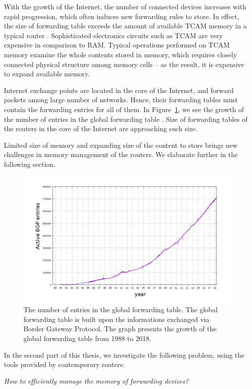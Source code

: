 With the growth of the Internet, the number of connected devices increases with rapid progression, which often induces new forwarding rules to store.
In effect, the size of forwarding table exceeds the amount of available TCAM memory in a typical router .
Sophisticated electronics circuits such as TCAM are very expensive in comparison to RAM.
Typical operations performed on TCAM memory examine the whole contents stored in memory, which requires closely connected physical structure among memory cells -- as the result, it is expensive to expand available memory.

Internet exchange points are located in the core of the Internet, and forward packets among large number of networks.
Hence, their forwarding tables must contain the forwarding entries for all of them.
In Figure~\ref{fig:bgp-entries}, we see the growth of the number of entries in the global forwarding table \cite{url-bgp-entries}.
Size of forwarding tables of the routers in the core of the Internet are approaching such size.

Limited size of memory and expanding size of the content to store brings new challenges in memory management of the routers.
We elaborate further in the following section.

\begin{figure}[t]
\centering
\includegraphics[width=0.59\columnwidth]{figs/bgp-entries.png}
\caption{The number of entries in the global forwarding table. The global forwarding table is built upon the informations exchanged via Border Gateway Protocol. The graph presents the growth of the global forwarding table from 1988 to 2018.}\label{fig:bgp-entries}
\vspace{-1em}
\end{figure}



In the second part of this thesis, we investigate the following problem, using the tools provided by contemporary routers:
\begin{center}
  \emph{How to efficiently manage the memory of forwarding devices?}
\end{center}


